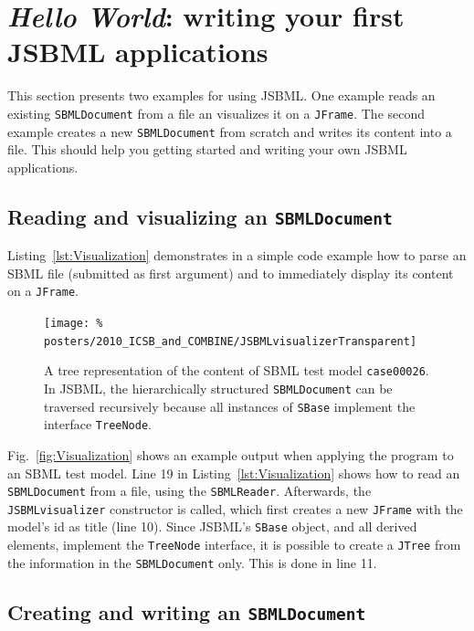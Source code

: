 \section{\emph{Hello World}: writing your first JSBML applications}

This section presents two examples for using JSBML. One example reads an
existing \texttt{SBMLDocument} from a file an visualizes it on a \texttt{JFrame}.
The second example creates a new \texttt{SBMLDocument} from scratch and writes
its content into a file. This should help you getting started and writing your
own JSBML applications.

\subsection{Reading and visualizing an \texttt{SBMLDocument}}

Listing~\vref{lst:Visualization} demonstrates in a simple code example how to
parse an SBML file (submitted as first argument) and to
immediately display its content on a \texttt{JFrame}.
%

\begin{figure}
\texttt{[image: \%
posters/2010\_ICSB\_and\_COMBINE/JSBMLvisualizerTransparent]}
\caption[Tree representation of an SBML file]{A tree representation of the
content of SBML test model \texttt{case00026}. In JSBML, the hierarchically
structured \texttt{SBMLDocument} can be traversed recursively because all
instances of \texttt{SBase} implement the interface \texttt{TreeNode}.}
\label{fig:Visualization}
\end{figure}
Fig.~\vref{fig:Visualization} shows an example output when applying the program
to an SBML test model.
%
Line 19 in Listing~\vref{lst:Visualization} shows how to read an
\texttt{SBMLDocument} from a file, using the \texttt{SBMLReader}. Afterwards,
the \texttt{JSBMLvisualizer} constructor is called, which first creates a new
\texttt{JFrame} with the model's id as title (line 10). Since JSBML's
\texttt{SBase} object, and all derived elements, implement the \texttt{TreeNode}
interface, it is possible to create a \texttt{JTree} from the information in the
\texttt{SBMLDocument} only. This is done in line 11.

\subsection{Creating and writing an \texttt{SBMLDocument}}

